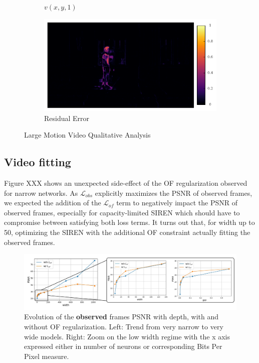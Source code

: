 \documentclass{article}
\begin{document}
\begin{figure}[h]
\begin{subfigure}{0.2\textwidth}
    \caption{$v(x,y,1)$}
\end{subfigure}%
\begin{subfigure}{0.2\textwidth}
	\centering
    \includegraphics[width=1\linewidth]{nd_scene/Skating_error.png}
    \caption{Residual Error}
\end{subfigure}
\caption{Large Motion Video Qualitative Analysis}
\end{figure}


\subsection{Video fitting}

Figure XXX shows an unexpected side-effect of the OF regularization observed for narrow networks.
As $\mathcal{L}_{obs}$ explicitly maximizes the PSNR of observed frames,
we expected the addition of the $\mathcal{L}_{of}$ term to negatively impact the PSNR of observed frames,
especially for capacity-limited SIREN which should have to compromise between satisfying both loss terms.
It turns out that, for width up to 50, optimizing the SIREN with the additional OF constraint
actually fitting the observed frames.

\label{sec_video_fit}
\begin{figure}[h]
\centering
\includegraphics[width=1\textwidth]{compression.png}
\caption{Evolution of the \textbf{observed} frames PSNR with depth, with and without OF regularization.
Left: Trend from very narrow to very wide models.
Right: Zoom on the low width regime with the x axis expressed either in number of neurons or corresponding Bits Per Pixel measure.}
\end{figure}
\end{document}
